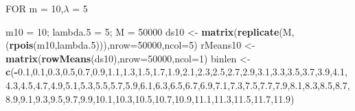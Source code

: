 \documentclass[
]{article}
\newenvironment{Shaded}{\begin{snugshade}}{\end{snugshade}}
\newcommand{\DataTypeTok}[1]{\textcolor[rgb]{0.13,0.29,0.53}{#1}}
\newcommand{\DecValTok}[1]{\textcolor[rgb]{0.00,0.00,0.81}{#1}}
\newcommand{\FloatTok}[1]{\textcolor[rgb]{0.00,0.00,0.81}{#1}}
\newcommand{\KeywordTok}[1]{\textcolor[rgb]{0.13,0.29,0.53}{\textbf{#1}}}
\newcommand{\NormalTok}[1]{#1}
\newcommand{\OperatorTok}[1]{\textcolor[rgb]{0.81,0.36,0.00}{\textbf{#1}}}
\newcommand{\StringTok}[1]{\textcolor[rgb]{0.31,0.60,0.02}{#1}}
\begin{document}
FOR m = 10,\(\lambda\) = 5

\begin{Shaded}
\begin{Highlighting}[]
\NormalTok{m10 =}\StringTok{ }\DecValTok{10}\NormalTok{; lambda}\FloatTok{.5}\NormalTok{ =}\StringTok{ }\DecValTok{5}\NormalTok{; M =}\StringTok{ }\DecValTok{50000}
\NormalTok{ds10 <-}\StringTok{ }\KeywordTok{matrix}\NormalTok{(}\KeywordTok{replicate}\NormalTok{(M,(}\KeywordTok{rpois}\NormalTok{(m10,lambda}\FloatTok{.5}\NormalTok{))),}\DataTypeTok{nrow=}\DecValTok{50000}\NormalTok{,}\DataTypeTok{ncol=}\DecValTok{5}\NormalTok{)}
\NormalTok{rMeans10 <-}\StringTok{ }\KeywordTok{matrix}\NormalTok{(}\KeywordTok{rowMeans}\NormalTok{(ds10),}\DataTypeTok{nrow=}\DecValTok{50000}\NormalTok{,}\DataTypeTok{ncol=}\DecValTok{1}\NormalTok{)}
\NormalTok{binlen <-}\StringTok{ }\KeywordTok{c}\NormalTok{(}\OperatorTok{-}\FloatTok{0.1}\NormalTok{,}\FloatTok{0.1}\NormalTok{,}\FloatTok{0.3}\NormalTok{,}\FloatTok{0.5}\NormalTok{,}\FloatTok{0.7}\NormalTok{,}\FloatTok{0.9}\NormalTok{,}\FloatTok{1.1}\NormalTok{,}\FloatTok{1.3}\NormalTok{,}\FloatTok{1.5}\NormalTok{,}\FloatTok{1.7}\NormalTok{,}\FloatTok{1.9}\NormalTok{,}\FloatTok{2.1}\NormalTok{,}\FloatTok{2.3}\NormalTok{,}\FloatTok{2.5}\NormalTok{,}\FloatTok{2.7}\NormalTok{,}\FloatTok{2.9}\NormalTok{,}\FloatTok{3.1}\NormalTok{,}\FloatTok{3.3}\NormalTok{,}\FloatTok{3.5}\NormalTok{,}\FloatTok{3.7}\NormalTok{,}\FloatTok{3.9}\NormalTok{,}\FloatTok{4.1}\NormalTok{,}\FloatTok{4.3}\NormalTok{,}\FloatTok{4.5}\NormalTok{,}\FloatTok{4.7}\NormalTok{,}\FloatTok{4.9}\NormalTok{,}\FloatTok{5.1}\NormalTok{,}\FloatTok{5.3}\NormalTok{,}\FloatTok{5.5}\NormalTok{,}\FloatTok{5.7}\NormalTok{,}\FloatTok{5.9}\NormalTok{,}\FloatTok{6.1}\NormalTok{,}\FloatTok{6.3}\NormalTok{,}\FloatTok{6.5}\NormalTok{,}\FloatTok{6.7}\NormalTok{,}\FloatTok{6.9}\NormalTok{,}\FloatTok{7.1}\NormalTok{,}\FloatTok{7.3}\NormalTok{,}\FloatTok{7.5}\NormalTok{,}\FloatTok{7.7}\NormalTok{,}\FloatTok{7.9}\NormalTok{,}\FloatTok{8.1}\NormalTok{,}\FloatTok{8.3}\NormalTok{,}\FloatTok{8.5}\NormalTok{,}\FloatTok{8.7}\NormalTok{,}\FloatTok{8.9}\NormalTok{,}\FloatTok{9.1}\NormalTok{,}\FloatTok{9.3}\NormalTok{,}\FloatTok{9.5}\NormalTok{,}\FloatTok{9.7}\NormalTok{,}\FloatTok{9.9}\NormalTok{,}\FloatTok{10.1}\NormalTok{,}\FloatTok{10.3}\NormalTok{,}\FloatTok{10.5}\NormalTok{,}\FloatTok{10.7}\NormalTok{,}\FloatTok{10.9}\NormalTok{,}\FloatTok{11.1}\NormalTok{,}\FloatTok{11.3}\NormalTok{,}\FloatTok{11.5}\NormalTok{,}\FloatTok{11.7}\NormalTok{,}\FloatTok{11.9}\NormalTok{)}

\end{Highlighting}
\end{Shaded}
\end{document}
